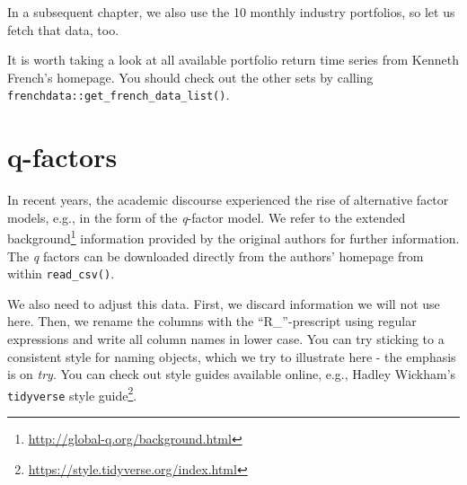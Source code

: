 \documentclass[
]{krantz}
\newenvironment{Shaded}{\begin{snugshade}}{\end{snugshade}}
\newcommand{\AttributeTok}[1]{\textcolor[rgb]{0.61,0.61,0.61}{#1}}
\newcommand{\DecValTok}[1]{\textcolor[rgb]{0.06,0.06,0.06}{#1}}
\newcommand{\FunctionTok}[1]{\textcolor[rgb]{0,0,0}{#1}}
\newcommand{\NormalTok}[1]{#1}
\newcommand{\OtherTok}[1]{\textcolor[rgb]{0.37,0.37,0.37}{#1}}
\newcommand{\SpecialCharTok}[1]{\textcolor[rgb]{0,0,0}{#1}}
\newcommand{\StringTok}[1]{\textcolor[rgb]{0.5,0.5,0.5}{#1}}
\renewcommand{\href}[2]{#2\footnote{\url{#1}}}
\begin{document}
In a subsequent chapter, we also use the 10 monthly industry portfolios, so let us fetch that data, too.

\begin{Shaded}
\end{Shaded}

It is worth taking a look at all available portfolio return time series from Kenneth French's homepage. You should check out the other sets by calling \texttt{frenchdata::get\_french\_data\_list()}.

\hypertarget{q-factors}{%
\section{q-factors}\label{q-factors}}

In recent years, the academic discourse experienced the rise of alternative factor models, e.g., in the form of the \citep{Hou2015} \emph{q}-factor model. We refer to the \href{http://global-q.org/background.html}{extended background} information provided by the original authors for further information. The \emph{q} factors can be downloaded directly from the authors' homepage from within \texttt{read\_csv()}.

We also need to adjust this data. First, we discard information we will not use here. Then, we rename the columns with the ``R\_''-prescript using regular expressions and write all column names in lower case. You can try sticking to a consistent style for naming objects, which we try to illustrate here - the emphasis is on \emph{try}. You can check out style guides available online, e.g., \href{https://style.tidyverse.org/index.html}{Hadley Wickham's \texttt{tidyverse} style guide}.
\end{document}
